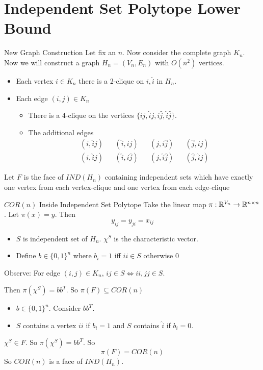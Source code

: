 \documentclass[aspectratio=1610]{beamer}
\begin{document}
\section{Independent Set Polytope Lower Bound}
\begin{frame}{New Graph Construction}
	Let fix an $n$. Now consider the complete graph $K_n$. Now we will construct a graph $H_n=(V_n,E_n)$ with $O(n^2)$ vertices.\pause
	
	\begin{itemize}
		\item Each vertex $i\in K_n$ there is a 2-clique on $i,\hat{i}$ in $H_n$.\pause
		
		\item Each edge $(i,j)\in K_n$ \begin{itemize}
			\item There is a 4-clique on the vertices $\{ij,\hat{i}j,i\hat{j},\hat{i}\hat{j}\}$.
			\item The additional edges\begin{align*}
				(i,\hat{i}j)  && (\hat{i},ij) && (j,i\hat{j}) && (\hat{j}, ij)\\
				(i,\hat{i}\hat{j}) && (\hat{i},i\hat{j}) && (j,\hat{i}\hat{j}) && (\hat{j},\hat{i}j)
			\end{align*}
		\end{itemize}
	\end{itemize}\pause

	Let $F$ is the face of $IND(H_n)$ containing independent sets which have exactly one vertex from each vertex-clique and one vertex from each edge-clique
\end{frame}
\begin{frame}{$COR(n)$ Inside  Independent Set Polytope}
	Take the linear map $\pi:\mathbb{R}^{V_n}\to \mathbb{R}^{n\times n}$. Let $\pi(x)=y$. Then $$y_{ij}=y_{ji}=x_{ij}$$\pause
	\begin{itemize}
		\item $S$ is independent set of $H_n$. $\chi^S$ is the characteristic vector.\pause
		
		\item Define $b\in \{0,1\}^n$ where $b_i=1$ iff $ii\in S$ otherwise $0$
	\end{itemize}\pause

	Observe: For edge $(i,j)\in K_n$, $ij\in S\iff ii,jj\in S$.

	Then $\pi(\chi^S)=bb^T$. So $\pi(F)\subseteq COR(n)$\pause

	\begin{itemize}
		\item $b\in\{0,1\}^n$. Consider $bb^T$. \pause
		
		\item $S$ contains a vertex $ii$ if $b_i=1$ and $S$ contains $\hat{i}$ if $b_i=0$.
	\end{itemize} \pause

	$\chi^S\in F$. So $\pi(\chi^S)=bb^T$. So $$\pi(F)=COR(n)$$ So $COR(n)$ is a face of $IND(H_n)$.
\end{frame}
\end{document}
